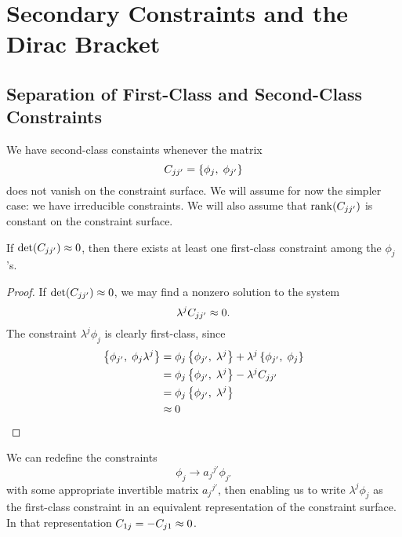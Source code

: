 \section{Secondary Constraints and the Dirac Bracket}

\subsection{Separation of First-Class and Second-Class Constraints}

\M
We have second-class constaints whenever the matrix
\begin{equation}
C_{jj'}=\left\{\phi_{j},\;\phi_{j'}\right\}
\end{equation}
does not vanish on the constraint surface. We will assume for now the
simpler case: we have irreducible constraints. We will also assume that
$\operatorname{rank}(C_{jj'})$ is constant on the constraint surface.

\begin{theorem}
If $\det(C_{jj'})\approx0$, then there exists at least one first-class
constraint among the $\phi_{j}$'s.
\end{theorem}

\begin{proof}
If $\det(C_{jj'})\approx0$, we may find a nonzero solution to the system
\begin{equation}
\lambda^{j}C_{jj'}\approx0.
\end{equation}
The constraint $\lambda^{j}\phi_{j}$ is clearly first-class, since
\begin{subequations}
\begin{align}
\left\{\phi_{j'},\;\phi_{j}\lambda^{j}\right\}
&=\phi_{j}\left\{\phi_{j'},\;\lambda^{j}\right\}+\lambda^{j}\left\{\phi_{j'},\;\phi_{j}\right\}\\
&=\phi_{j}\left\{\phi_{j'},\;\lambda^{j}\right\}-\lambda^{j}C_{jj'}\\
&=\phi_{j}\left\{\phi_{j'},\;\lambda^{j}\right\}\\
&\approx0\qedhere
\end{align}
\end{subequations}
\end{proof}
\M
We can redefine the constraints
\begin{equation}
\phi_{j}\to{a_{j}}^{j'}\phi_{j'}
\end{equation}
with some appropriate invertible matrix ${a_{j}}^{j'}$, then enabling us
to write $\lambda^{j}\phi_{j}$ as the first-class constraint in an
equivalent representation of the constraint surface. In that
representation $C_{1j}=-C_{j1}\approx0$.

